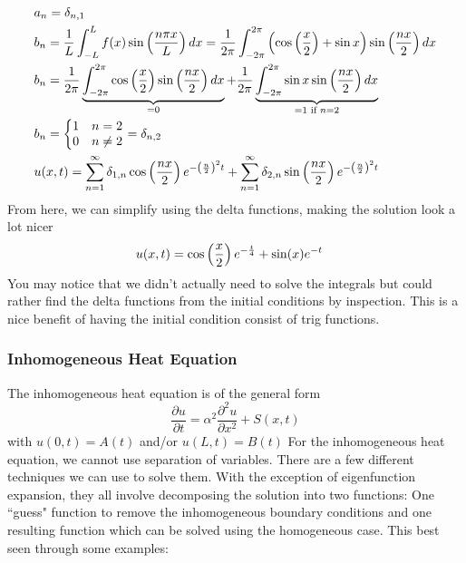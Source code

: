 \documentclass[11pt, fleqn]{article}
\begin{document}
\begin{align*}
    &a_n=\delta_{n,1}\\
    &b_n=\frac{1}{L}\int_{-L}^L f(x)\sin\left( \frac{n\pi x}{L} \right)dx=\frac{1}{2\pi}\int_{-2\pi}^{2\pi}\left( \cos\left( \frac{x}{2} \right)+\sin x \right)\sin\left( \frac{nx}{2} \right)dx\\
    &b_n=\frac{1}{2\pi}\underbrace{\int_{-2\pi}^{2\pi}\cos\left( \frac{x}{2} \right)\sin\left( \frac{nx}{2} \right)dx}_{=0}+\frac{1}{2\pi}\underbrace{\int_{-2\pi}^{2\pi}\sin x\sin\left( \frac{nx}{2} \right)dx}_{=1\text{ if }n=2}\\
    &b_n=\left\{\begin{matrix} 1 & n=2\\ 0 & n\neq 2 \end{matrix}\right.=\delta_{n,2}\\
    &u(x,t)=\sum_{n=1}^\infty\delta_{1,n}\cos\left( \frac{nx}{2} \right)e^{-\left( \frac{n}{2} \right)^2t}+\sum_{n=1}^\infty\delta_{2,n}\sin\left( \frac{nx}{2} \right)e^{-\left( \frac{n}{2} \right)^2t}
\end{align*}
From here, we can simplify using the delta functions, making the solution look a lot nicer
\begin{align*}
    &u(x,t)=\cos\left( \frac{x}{2} \right)e^{-\frac{t}{4}}+\sin (x)e^{-t}
\end{align*}
You may notice that we didn't actually need to solve the integrals but could rather find the delta functions from the initial conditions by inspection. This is a nice benefit of having the initial condition consist of trig functions.

\subsubsection{Inhomogeneous Heat Equation}
The inhomogeneous heat equation is of the general form
$$\frac{\partial u}{\partial t}=\alpha^2\frac{\partial^2 u}{\partial x^2}+S(x,t)$$
with $u(0,t)=A(t)$ and/or $u(L,t)=B(t)$
For the inhomogeneous heat equation, we cannot use separation of variables. There are a few different techniques we can use to solve them. With the exception of eigenfunction expansion, they all involve decomposing the solution into two functions: One ``guess" function to remove the inhomogeneous boundary conditions and one resulting function which can be solved using the homogeneous case. This best seen through some examples:\\
\end{document}
